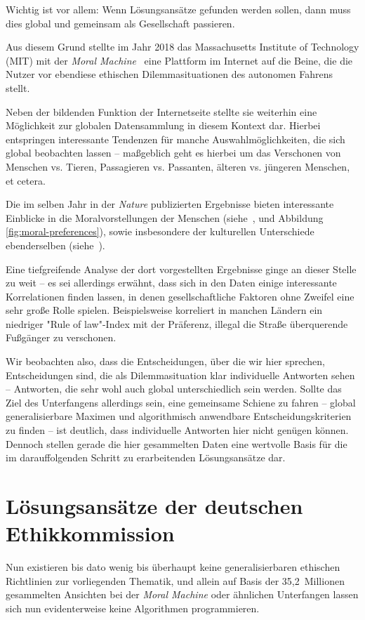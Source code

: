 \documentclass[twocolumn, german]{tum-article}
\begin{document}
Wichtig ist vor allem: Wenn Lösungsansätze gefunden werden sollen, dann muss dies global und gemeinsam als Gesellschaft passieren.

Aus diesem Grund stellte im Jahr 2018 das Massachusetts Institute of Technology (MIT) mit der \emph{Moral Machine}~\cite{moral-machine-web} eine Plattform im Internet auf die Beine, die die Nutzer vor ebendiese ethischen Dilemmasituationen des autonomen Fahrens stellt.

Neben der bildenden Funktion der Internetseite stellte sie weiterhin eine Möglichkeit zur globalen Datensammlung in diesem Kontext dar.
Hierbei entspringen interessante Tendenzen für manche Auswahlmöglichkeiten, die sich global beobachten lassen -- maßgeblich geht es hierbei um das Verschonen von Menschen vs. Tieren, Passagieren vs. Passanten, älteren vs. jüngeren Menschen, et cetera.

Die im selben Jahr in der \emph{Nature} publizierten Ergebnisse bieten interessante Einblicke in die Moralvorstellungen der Menschen (siehe~\cite[S. 61]{moral-machine}, und Abbildung \vref{fig:moral-preferences}), sowie insbesondere der kulturellen Unterschiede ebenderselben (siehe~\cite[S. 62]{moral-machine}).

Eine tiefgreifende Analyse der dort vorgestellten Ergebnisse ginge an dieser Stelle zu weit -- es sei allerdings erwähnt, dass sich in den Daten einige interessante Korrelationen finden lassen, in denen gesellschaftliche Faktoren ohne Zweifel eine sehr große Rolle spielen.
Beispielsweise korreliert in manchen Ländern ein niedriger "Rule of law"-Index mit der Präferenz, illegal die Straße überquerende Fußgänger zu verschonen.

Wir beobachten also, dass die Entscheidungen, über die wir hier sprechen, Entscheidungen sind, die als Dilemmasituation klar individuelle Antworten sehen -- Antworten, die sehr wohl auch global unterschiedlich sein werden.
Sollte das Ziel des Unterfangens allerdings sein, eine gemeinsame Schiene zu fahren -- global generalisierbare Maximen und algorithmisch anwendbare Entscheidungskriterien zu finden -- ist deutlich, dass individuelle Antworten hier nicht genügen können. Dennoch stellen gerade die hier gesammelten Daten eine wertvolle Basis für die im darauffolgenden Schritt zu erarbeitenden Lösungsansätze dar.


\section{Lösungsansätze der deutschen Ethikkommission}
Nun existieren bis dato wenig bis überhaupt keine generalisierbaren ethischen Richtlinien zur vorliegenden Thematik, und allein auf Basis der 35,2~Millionen gesammelten Ansichten bei der \emph{Moral Machine} oder ähnlichen Unterfangen lassen sich nun evidenterweise keine Algorithmen programmieren.
\end{document}
